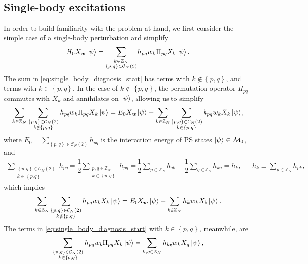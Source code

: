 \documentclass[nofootinbib,notitlepage,11pt]{revtex4-2}
\newcommand{\f}[2]{\dfrac{#1}{#2}} %
\newcommand{\p}[1]{\left(#1\right)} %
\renewcommand{\set}[1]{\left\{#1\right\}} %
\newcommand{\m}{\bm} %
\newcommand{\1}{\mathds{1}}
\newcommand{\C}{\mathcal{C}}
\newcommand{\M}{\mathcal{M}}
\newcommand{\ZZ}{\mathbb{Z}}
\begin{document}
\subsection{Single-body excitations}
\label{sec:single_body_eigenstates}

In order to build familiarity with the problem at hand, we first
consider the simple case of a single-body perturbation and simplify
\begin{align}
  H_0 X_{\m w} \ket\psi
  = \sum_{\substack{k\in\ZZ_N\\\set{p,q}\in\C_N\p{2}}}
  h_{pq} w_k \Pi_{pq} X_k \ket\psi.
  \label{eq:single_body_diagnosis_start}
\end{align}
The sum in \eqref{eq:single_body_diagnosis_start} has terms with
$k\notin\set{p,q}$, and terms with $k\in\set{p,q}$.  In the case of
$k\notin\set{p,q}$, the permutation operator $\Pi_{pq}$ commutes with
$X_k$ and annihilates on $\ket\psi$, allowing us to simplify
\begin{align}
  \sum_{k\in\ZZ_N} \sum_{\substack{\set{p,q}\in\C_N\p{2}\\k\notin\set{p,q}}}
  h_{pq} w_k \Pi_{pq} X_k \ket\psi
  = E_0 X_{\m w} \ket\psi
  - \sum_{k\in\ZZ_N} \sum_{\substack{\set{p,q}\in\C_N\p{2}\\k\in\set{p,q}}}
  h_{pq} w_k X_k \ket\psi,
\end{align}
where $E_0 = \sum_{\set{p,q}\in\C_N\p{2}} h_{pq}$ is the interaction
energy of PS states $\ket\psi\in\M_0$, and
\begin{align}
  \sum_{\substack{\set{p,q}\in\C_N\p{2}\\k\in\set{p,q}}} h_{pq}
  = \f12 \sum_{\substack{p,q\in\ZZ_N\\k\in\set{p,q}}} h_{pq}
  = \f12 \sum_{p\in\ZZ_N} h_{pk} + \f12 \sum_{q\in\ZZ_N} h_{kq}
  = h_k,
  &&
  h_k \equiv \sum_{p\in\ZZ_N} h_{pk},
\end{align}
which implies
\begin{align}
  \sum_{k\in\ZZ_N} \sum_{\substack{\set{p,q}\in\C_N\p{2}\\k\notin\set{p,q}}}
  h_{pq} w_k X_k \ket\psi
  = E_0 X_{\m w} \ket\psi
  - \sum_{k\in\ZZ_N} h_k w_k X_k \ket\psi.
\end{align}
The terms in \eqref{eq:single_body_diagnosis_start} with
$k\in\set{p,q}$, meanwhile, are
\begin{align}
  \sum_{\substack{\set{p,q}\in\C_N\p{2}\\k\in\set{p,q}}}
  h_{pq} w_k \Pi_{pq} X_k \ket\psi
  = \sum_{k,q\in\ZZ_N} h_{kq} w_k X_q \ket\psi,
\end{align}
\end{document}
